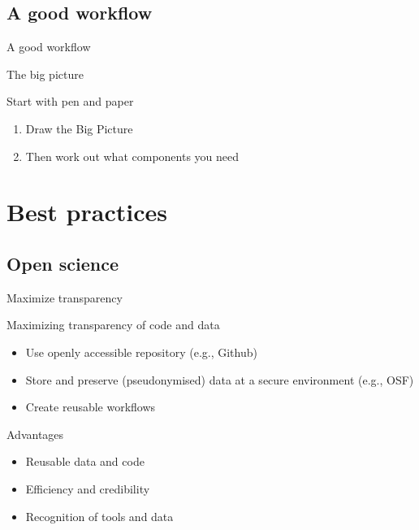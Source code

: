 \documentclass{beamer}
\begin{document}
\subsection{A good workflow}
\begin{frame}
	A good workflow
\end{frame}

\begin{frame}{The big picture}
\begin{block}{Start with pen and paper}
\begin{enumerate}[<+->]
	\item Draw the Big Picture
	\item Then work out what components you need
\end{enumerate}
\end{block}
\end{frame}

\section{Best practices}
\subsection{Open science}
\begin{frame}{Maximize transparency}
\begin{block}{Maximizing transparency of code and data}
	\begin{itemize}[<+->]
		\item Use openly accessible repository (e.g., Github)
		\item Store and preserve (pseudonymised) data at a secure environment (e.g., OSF)
		\item Create reusable workflows 
	\end{itemize}
\end{block}
\pause
\begin{exampleblock}{Advantages}
	\begin{itemize}[<+->]
		\item Reusable data and code
		\item Efficiency and credibility 
		\item Recognition of tools and data
	\end{itemize}
\end{exampleblock}

\end{frame}	
\end{document}
